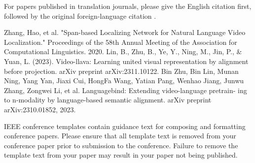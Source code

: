 \documentclass[conference]{IEEEtran}
\begin{document}
For papers published in translation journals, please give the English 
citation first, followed by the original foreign-language citation \cite{b6}.

\begin{thebibliography}{00}
 Zhang, Hao, et al. "Span-based Localizing Network for Natural Language Video Localization." Proceedings of the 58th Annual Meeting of the Association for Computational Linguistics. 2020.
 Lin, B., Zhu, B., Ye, Y., Ning, M., Jin, P., & Yuan, L. (2023). Video-llava: Learning united visual representation by alignment before projection. arXiv preprint arXiv:2311.10122.
Bin Zhu, Bin Lin, Munan Ning, Yang Yan, Jiaxi Cui, HongFa Wang, Yatian Pang, Wenhao Jiang, Junwu Zhang, Zongwei Li, et al. Languagebind: Extending video-language pretrain- ing to n-modality by language-based semantic alignment. arXiv preprint arXiv:2310.01852, 2023.

\end{thebibliography}
\vspace{12pt}
\color{red}
IEEE conference templates contain guidance text for composing and formatting conference papers. Please ensure that all template text is removed from your conference paper prior to submission to the conference. Failure to remove the template text from your paper may result in your paper not being published.
\end{document}
